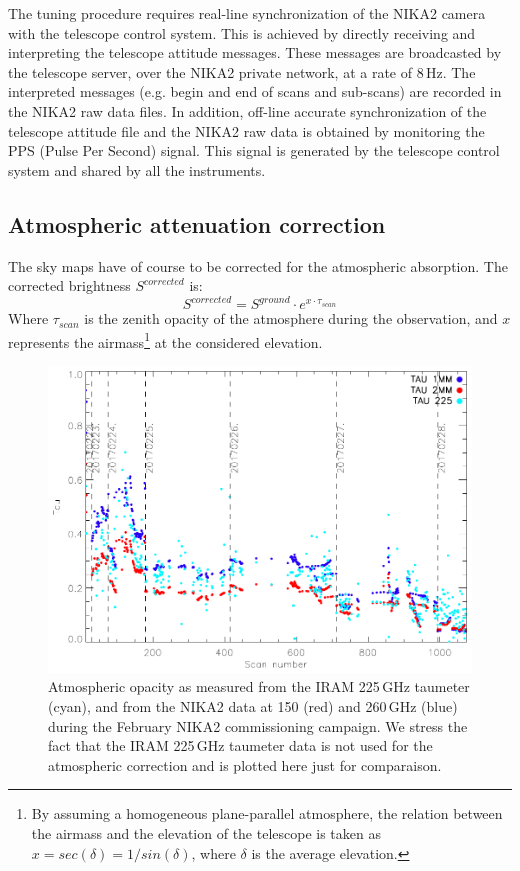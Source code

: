 \documentclass[]{aa} %
\begin{document}
The tuning procedure requires real-line synchronization of the NIKA2 camera with the telescope control system. This is achieved by directly receiving and interpreting the telescope attitude messages. These messages are broadcasted by the telescope server, over the NIKA2 private network, at a rate of 8\,Hz. The interpreted messages (e.g. begin and end of scans and sub-scans) are recorded in the NIKA2 raw data files. In addition, off-line accurate synchronization of the telescope attitude file and the NIKA2 raw data is obtained by monitoring the PPS (Pulse Per Second) signal. This signal is generated by the telescope control system and shared by all the instruments.


\subsection{Atmospheric attenuation correction}
\label{Atmospheric attenuation correction}


The sky maps have of course to be corrected for the atmospheric absorption. The corrected brightness $S^{corrected}$ is:
\begin{equation}\label{eq:opa}
S^{corrected} =  S^{ground} \cdot e^{ x \cdot \tau_{scan}}
\end{equation}
Where $\tau_{scan}$ is the zenith opacity of the atmosphere during the
observation, and $x$ represents the airmass\footnote{ By assuming a
  homogeneous plane-parallel atmosphere, the relation between the
  airmass and the elevation of the telescope is taken as $x =
  sec(\delta)=1/sin(\delta)$, where $\delta$ is the average
  elevation.} at the considered elevation.

\begin{figure}
\includegraphics[scale=0.55]{./opacity_evol_run22.pdf}
\caption{Atmospheric opacity as measured from the IRAM 225\,GHz taumeter (cyan), and from the NIKA2 data at 150 (red) and 260\,GHz (blue) during the February NIKA2 commissioning campaign.
 We stress the fact that the IRAM 225\,GHz taumeter data is not used for the atmospheric correction and is plotted here just for comparaison.
  \label{fig:taumeas}}
\end{figure}
\end{document}
